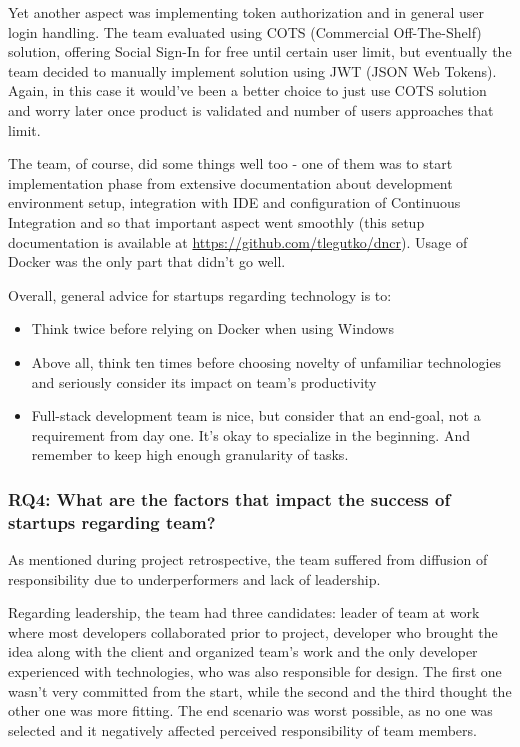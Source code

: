 \documentclass{article}
\begin{document}
Yet another aspect was implementing token authorization and in general user login handling. The team evaluated using COTS (Commercial Off-The-Shelf) solution, offering Social Sign-In for free until certain user limit, but eventually the team decided to manually implement solution using JWT (JSON Web Tokens). Again, in this case it would've been a better choice to just use COTS solution and worry later once product is validated and number of users approaches that limit.

The team, of course, did some things well too - one of them was to start implementation phase from extensive documentation about development environment setup, integration with IDE and configuration of Continuous Integration and so that important aspect went smoothly (this setup documentation is available at \url{https://github.com/tlegutko/dncr}). Usage of Docker was the only part that didn't go well.

Overall, general advice for startups regarding technology is to:
\begin{itemize}
\item Think twice before relying on Docker when using Windows
\item Above all, think ten times before choosing novelty of unfamiliar technologies and seriously consider its impact on team's productivity
\item Full-stack development team is nice, but consider that an end-goal, not a requirement from day one. It's okay to specialize in the beginning. And remember to keep high enough granularity of tasks.
\end{itemize}

\subsubsection{RQ4: What are the factors that impact the success of startups regarding team?}
As mentioned during project retrospective, the team suffered from diffusion of responsibility due to underperformers and lack of leadership.

Regarding leadership, the team had three candidates: leader of team at work where most developers collaborated prior to project, developer who brought the idea along with the client and organized team's work and the only developer experienced with technologies, who was also responsible for design. The first one wasn't very committed from the start, while the second and the third thought the other one was more fitting. The end scenario was worst possible, as no one was selected and it negatively affected perceived responsibility of team members.
\end{document}

